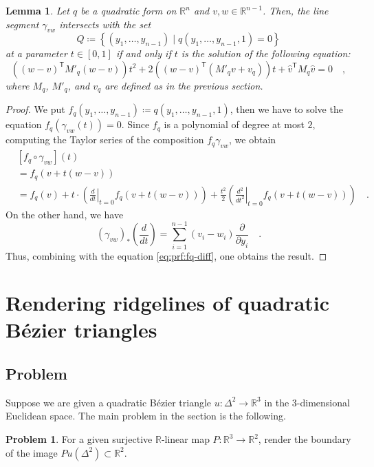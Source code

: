 \documentclass[pdftex,a4paper,12pt]{scrartcl}
\theoremstyle{plain}
\newtheorem{lemma}[theorem]{Lemma}
\theoremstyle{definition}
\newtheorem{problem}{Problem}
\theoremstyle{remark}
\numberwithin{equation}{section}
\begin{document}
\begin{lemma}
Let $q$ be a quadratic form on $\mathbb R^n$ and $v,w\in\mathbb R^{n-1}$.
Then, the line segment $\gamma_{vw}$ intersects with the set
\[
Q\coloneqq \left\{(y_1,\dots,y_{n-1})\mid q(y_1,\dots,y_{n-1},1)=0\right\}
\]
at a parameter $t\in[0,1]$ if and only if $t$ is the solution of the following equation:
\[
\left((w-v)^{\mathsf T}M'_q(w-v)\right)t^2
+ 2\left((w-v)^{\mathsf T}(M'_q v + v_q)\right)t
+ \widehat v^{\mathsf T}M_q \widehat v
= 0
\quad,
\]
where $M_q$, $M'_q$, and $v_q$ are defined as in the previous section.
\end{lemma}
\begin{proof}
We put $f_q(y_1,\dots,y_{n-1})\coloneqq q(y_1,\dots,y_{n-1},1)$, then we have to solve the equation $f_q(\gamma_{vw}(t))=0$.
Since $f_q$ is a polynomial of degree at most $2$, computing the Taylor series of the composition $f_q\gamma_{vw}$, we obtain
\[
\begin{split}
&[f_q\circ\gamma_{vw}](t) \\
&= f_q(v+t(w-v)) \\
&= f_q(v)
+ t\cdot\left(\left.\frac{d}{dt}\right|_{t=0} f_q(v+t(w-v))\right)
+ \frac{t^2}{2}\left(\left.\frac{d^2}{dt^2}\right|_{t=0} f_q(v+t(w-v))\right)
\quad.
\end{split}
\]
On the other hand, we have
\[
(\gamma_{vw})_\ast\left(\frac{d}{dt}\right)
= \sum_{i=1}^{n-1} (v_i-w_i)\frac\partial{\partial y_i}
\quad.
\]
Thus, combining with the equation \eqref{eq:prf:fq-diff}, one obtains the result.
\end{proof}


\section{Rendering ridgelines of quadratic B\'ezier triangles}

\subsection{Problem}

Suppose we are given a quadratic B\'ezier triangle $u:\Delta^2\to\mathbb R^3$ in the $3$-dimensional Euclidean space.
The main problem in the section is the following.

\begin{problem}
For a given surjective $\mathbb R$-linear map $P:\mathbb R^3\to\mathbb R^2$, render the boundary of the image $Pu(\Delta^2)\subset\mathbb R^2$.
\end{problem}
\end{document}
